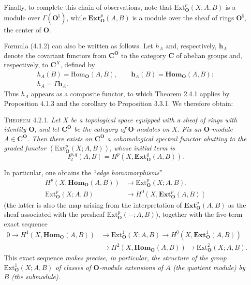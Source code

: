 \clearpage
{}

Finally, to complete this chain of observations, note that
$\mathrm{Ext}_{\mathbf O}^p(X;A,B)$ is a module over $\Gamma({\mathbf O}^\natural)$, while
$\mathbf{Ext}_{\mathbf O}^p(A,B)$ is a module over the sheaf of rings ${\mathbf O}^\natural$, the
center of ${\mathbf O}$.

Formula (4.1.2) can also be written as follows. Let $h_A$ and, respectively,
$\mathbf{h}_A$ denote the covariant functors from $\mathbf C^{\mathbf O}$ to the category $\mathbf C$ of
abelian groups and, respectively, to $\mathbf C^X$, defined by
\[
\tag{4.2.4}
\begin{gathered}
h_A(B)=\mathrm{Hom}_{\mathbf O}(A,B),\qquad
\mathbf{h}_A(B)=\mathbf{Hom}_{\mathbf O}(A,B):\\
h_A=\Gamma\mathbf{h}_A.
\end{gathered}
\]
Thus $h_A$ appears as a composite functor, to which Theorem 2.4.1 applies by
Proposition 4.1.3 and the corollary to Proposition 3.3.1. We therefore obtain:

\textsc{Theorem 4.2.1.} \textit{Let $X$ be a topological space
equipped with a sheaf of rings with identity ${\mathbf O}$, and let $\mathbf C^{\mathbf O}$ be the category
of ${\mathbf O}$-modules on $X$. Fix an ${\mathbf O}$-module $A\in \mathbf C^{\mathbf O}$. Then there exists on
$\mathbf C^{\mathbf O}$ a cohomological spectral functor abutting to the graded functor
$(\mathrm{Ext}_{\mathbf O}^p(X;A,B))$, whose initial term is}
\[
\tag{4.2.5}
I_2^{p,q}(A,B)=H^p(X,\mathbf{Ext}_{\mathbf O}^q(A,B)).
\]

In particular, one obtains the ``\textit{edge homomorphisms}''
\[
\tag{4.2.6}
\begin{aligned}
H^p(X,\mathbf{Hom}_{\mathbf O}(A,B))&\to
  \mathrm{Ext}_{\mathbf O}^p(X;A,B),\\
\mathrm{Ext}_{\mathbf O}^p(X;A,B)&\to
  H^0(X,\mathbf{Ext}_{\mathbf O}^p(A,B))
\end{aligned}
\]
(the latter is also the map arising from the interpretation of
$\mathbf{Ext}_{\mathbf O}^p(A,B)$ as the sheaf associated with the presheaf
$\mathrm{Ext}_{\mathbf O}^p(-;A,B)$), together with the five-term exact sequence
\[
\tag{4.2.7}
\begin{aligned}
0\to H^1(X,\mathbf{Hom}_{\mathbf O}(A,B))
&\to \mathrm{Ext}_{\mathbf O}^1(X;A,B)
\to H^0(X,\mathbf{Ext}_{\mathbf O}^1(A,B))\\
&\to H^2(X,\mathbf{Hom}_{\mathbf O}(A,B))
\to \mathrm{Ext}_{\mathbf O}^2(X;A,B).
\end{aligned}
\]
This exact sequence \textit{makes precise, in particular, the structure of
the group $\mathrm{Ext}_{\mathbf O}^1(X;A,B)$ of classes of ${\mathbf O}$-module extensions of
$A$ \textup{(the quotient module)} by $B$ \textup{(the submodule).}}

